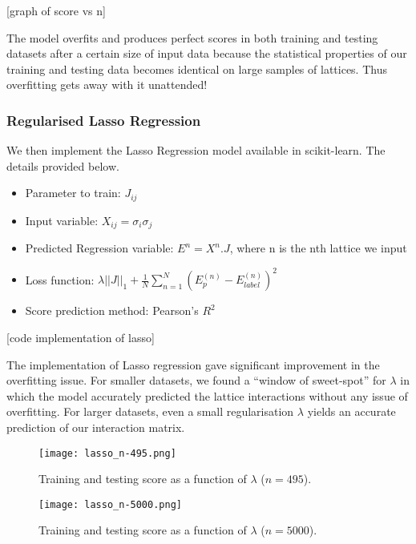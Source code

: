 [graph of score vs n]

The model overfits and produces perfect scores in both training and testing datasets after a certain size of input data because the statistical properties of our training and testing data becomes identical on large samples of lattices.
Thus overfitting gets away with it unattended!

\subsubsection{Regularised Lasso Regression}
We then implement the Lasso Regression model available in scikit-learn. The details provided below.
\begin{itemize}
    \item Parameter to train: \(J_{ij}\)
    \item Input variable: \(X_{ij}=\sigma_i\sigma_j\)
    \item Predicted Regression variable: \(E^n=X^n.J\), where n is the nth lattice we input
    \item Loss function: \(\lambda ||J||_1 + \frac{1}{N} \sum_{n=1}^N(E_p^{(n)}-E_{label}^{(n)})^2\)
    \item Score prediction method: Pearson's \(R^2\)
\end{itemize}

[code implementation of lasso]

The implementation of Lasso regression gave significant improvement in the overfitting issue.
For smaller datasets, we found a ``window of sweet-spot'' for \(\lambda\) in which the model accurately predicted the lattice interactions without any issue of overfitting.
For larger datasets, even a small regularisation \(\lambda\) yields an accurate prediction of our interaction matrix.

\begin{figure}[h!]
    \centering
    \texttt{[image: lasso\_n-495.png]}
    \caption{Training and testing score as a function of \( \lambda \) (\( n=495 \)).}
\end{figure}


\begin{figure}[h!]
    \centering
    \texttt{[image: lasso\_n-5000.png]}
    \caption{Training and testing score as a function of \( \lambda \) (\( n=5000 \)).}
\end{figure}


